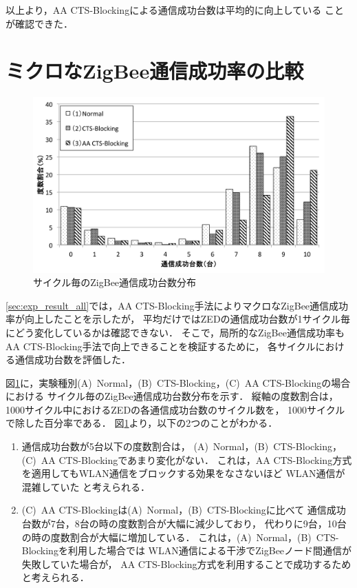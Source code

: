 \documentclass[12pt]{jreport}
\begin{document}
以上より，AA CTS-Blockingによる通信成功台数は平均的に向上している
ことが確認できた．

\section{ミクロなZigBee通信成功率の比較}
\label{sec:exp_result_part}

\begin{figure}[bt]
 \centering
 \includegraphics[width=\columnwidth]{figure/eff_one_zigbee.pdf}
 \caption{サイクル毎のZigBee通信成功台数分布}
 \label{fig:eff_one_zigbee}
\end{figure}

\ref{sec:exp_result_all}では，AA CTS-Blocking手法によりマクロなZigBee通信成功率が向上したことを示したが，
平均だけではZEDの通信成功台数が1サイクル毎にどう変化しているかは確認できない．
そこで，局所的なZigBee通信成功率もAA CTS-Blocking手法で向上できることを検証するために，
各サイクルにおける通信成功台数を評価した．

図\ref{fig:eff_one_zigbee}に，実験種別(A)~Normal，(B)~CTS-Blocking，(C)~AA CTS-Blockingの場合における
サイクル毎のZigBee通信成功台数分布を示す．
縦軸の度数割合は，1000サイクル中におけるZEDの各通信成功台数のサイクル数を，
1000サイクルで除した百分率である．
図\ref{fig:eff_one_zigbee}より，以下の2つのことがわかる．
\begin{enumerate}
 \item 通信成功台数が5台以下の度数割合は，
 (A)~Normal，(B)~CTS-Blocking， (C)~AA CTS-Blockingであまり変化がない．
これは，AA CTS-Blocking方式を適用してもWLAN通信をブロックする効果をなさないほど
WLAN通信が混雑していた
と考えられる．

 \item  (C)~AA CTS-Blockingは(A)~Normal，(B)~CTS-Blockingに比べて
通信成功台数が7台，8台の時の度数割合が大幅に減少しており，
代わりに9台，10台の時の度数割合が大幅に増加している．
これは，(A)~Normal，(B)~CTS-Blockingを利用した場合では
WLAN通信による干渉でZigBeeノード間通信が失敗していた場合が，
AA CTS-Blocking方式を利用することで成功するためと考えられる．

\end{enumerate}
\end{document}
